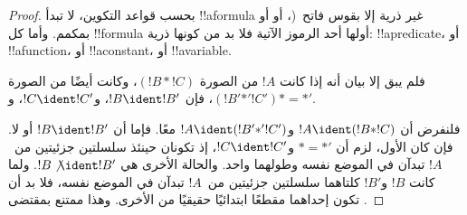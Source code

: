 \documentclass[../../../include/open-logic-section]{subfiles}
\begin{document}
\begin{proof}
بحسب قواعد التكوين، لا تبدأ !!a{formula} غير ذرية إلا بقوس
فاتح~(، أو  أو بمكمم. وأما
كل !!{formula} أولها أحد الرموز الآتية فلا بد من كونها ذرية:
!!a{predicate}، أو !!a{function}، أو !!a{constant}، أو
!!a{variable}.

فلم يبق إلا بيان أنه إذا كانت $!A$ من
الصورة $(!B \ast !C)$، وكانت أيضًا من الصورة $(!B'
\mathbin{\ast'} !C')$، فإن $!B \ident !B'$، و$!C \ident !C'$،
و$\ast = {\ast'}$.

فلنفرض أن $!A \ident (!B \ast !C)$ و$!A \ident (!B'
\mathbin{\ast'} !C')$ معًا. فإما أن $!B \ident !B'$ أو لا.
فإن كان الأول، لزم أن $\ast = {\ast'}$ و$!C \ident !C'$،
إذ تكونان حينئذ سلسلتين جزئيتين من~$!A$ تبدآن في الموضع نفسه
وطولهما واحد. والحالة الأخرى هي $!B \not\ident !B'$. ولما كانت
$!B$ و$!B'$ كلتاهما سلسلتين جزئيتين من~$!A$ تبدآن في الموضع نفسه،
فلا بد أن تكون إحداهما مقطعًا ابتدائيًا حقيقيًا من الأخرى. وهذا
ممتنع بمقتضى .
\end{proof}
\end{document}
